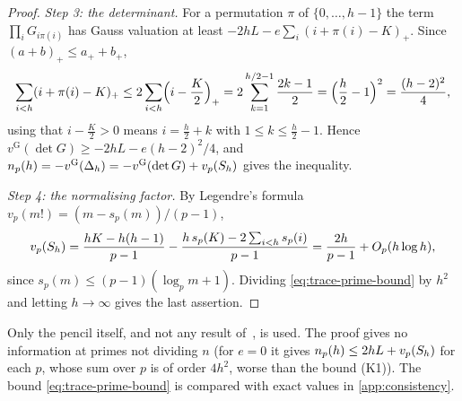 \begin{proof}
\emph{Step 3: the determinant.} For a permutation $\pi$ of $\{0,\dots,h-1\}$ the term
$\prod_iG_{i\pi(i)}$ has Gauss valuation at least $-2hL-e\sum_i(i+\pi(i)-K)_+$. Since
$(a+b)_+\le a_++b_+$,
\[
\sum_{i<h}(i+\pi(i)-K)_+\le2\sum_{i<h}\Bigl(i-\frac K2\Bigr)_+
=2\sum_{k=1}^{h/2-1}\frac{2k-1}2=\Bigl(\frac h2-1\Bigr)^2=\frac{(h-2)^2}4 ,
\]
using that $i-\frac K2>0$ means $i=\frac h2+k$ with $1\le k\le\frac h2-1$. Hence
$v^{\mathrm G}(\det G)\ge-2hL-e(h-2)^2/4$, and
$n_p(h)=-v^{\mathrm G}(\Delta_h)=-v^{\mathrm G}(\det G)+v_p(S_h)$ gives the inequality.

\emph{Step 4: the normalising factor.} By Legendre's formula $v_p(m!)=(m-s_p(m))/(p-1)$,
\[
v_p(S_h)=\frac{hK-h(h-1)}{p-1}-\frac{h\,s_p(K)-2\sum_{i<h}s_p(i)}{p-1}
=\frac{2h}{p-1}+O_p(h\log h),
\]
since $s_p(m)\le(p-1)(\log_pm+1)$. Dividing \eqref{eq:trace-prime-bound} by $h^2$ and
letting $h\to\infty$ gives the last assertion.
\end{proof}

\begin{remark}
Only the pencil itself, and not any result of~\Kri, is used. The proof gives no information at
primes not dividing $n$ (for $e=0$ it gives $n_p(h)\le2hL+v_p(S_h)$ for each $p$, whose sum over $p$ is
of order $4h^2$, worse than the bound (K1)). The bound \eqref{eq:trace-prime-bound} is compared with exact
values in \cref{app:consistency}.
\end{remark}
